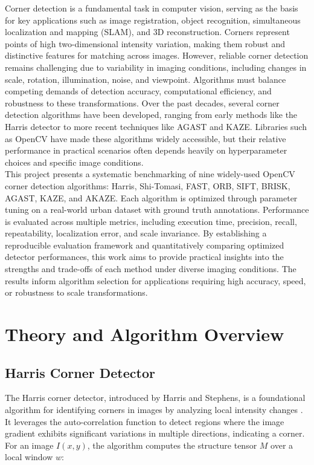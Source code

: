 \documentclass[journal]{IEEEtran}
\begin{document}
Corner detection is a fundamental task in computer vision, serving as the basis for key applications such as image registration, object recognition, simultaneous localization and mapping (SLAM), and 3D reconstruction. Corners represent points of high two-dimensional intensity variation, making them robust and distinctive features for matching across images. However, reliable corner detection remains challenging due to variability in imaging conditions, including changes in scale, rotation, illumination, noise, and viewpoint. Algorithms must balance competing demands of detection accuracy, computational efficiency, and robustness to these transformations. Over the past decades, several corner detection algorithms have been developed, ranging from early methods like the Harris detector to more recent techniques like AGAST and KAZE. Libraries such as OpenCV have made these algorithms widely accessible, but their relative performance in practical scenarios often depends heavily on hyperparameter choices and specific image conditions.\\

This project presents a systematic benchmarking of nine widely-used OpenCV corner detection algorithms: Harris, Shi-Tomasi, FAST, ORB, SIFT, BRISK, AGAST, KAZE, and AKAZE. Each algorithm is optimized through parameter tuning on a real-world urban dataset with ground truth annotations. Performance is evaluated across multiple metrics, including execution time, precision, recall, repeatability, localization error, and scale invariance. By establishing a reproducible evaluation framework and quantitatively comparing optimized detector performances, this work aims to provide practical insights into the strengths and trade-offs of each method under diverse imaging conditions. The results inform algorithm selection for applications requiring high accuracy, speed, or robustness to scale transformations.\\

\section{Theory and Algorithm Overview}
\label{section:theory}

\subsection{Harris Corner Detector}
The Harris corner detector, introduced by Harris and Stephens, is a foundational algorithm for identifying corners in images by analyzing local intensity changes \cite{Harris_Corner}. It leverages the auto-correlation function to detect regions where the image gradient exhibits significant variations in multiple directions, indicating a corner. For an image \( I(x, y) \), the algorithm computes the structure tensor \( M \) over a local window \( w \):
\end{document}
